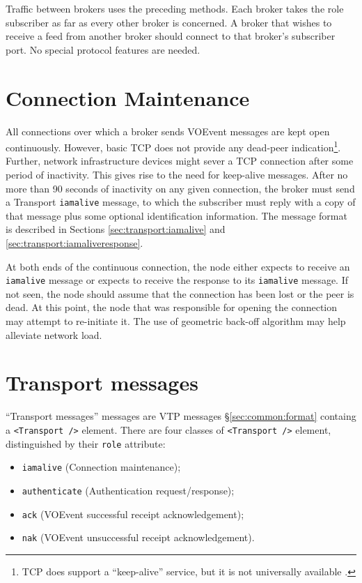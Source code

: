 \documentclass[a4paper,11pt]{ivoa}
\begin{document}
Traffic between brokers uses the preceding methods. Each broker takes the role
subscriber as far as every other broker is concerned. A broker that wishes to
receive a feed from another broker should connect to that broker's subscriber
port. No special protocol features are needed.

\section{Connection Maintenance}
\label{sec:maintenance}

All connections over which a broker sends VOEvent messages are kept open
continuously. However, basic TCP does not provide any dead-peer
indication\footnote{ TCP does support a ``keep-alive'' service, but it is not
universally available \citep{Braden:1989}.}. Further, network infrastructure
devices might sever a TCP connection after some period of inactivity. This
gives rise to the need for keep-alive messages. After no more than 90 seconds
of inactivity on any given connection, the broker must send a Transport
\texttt{iamalive} message, to which the subscriber must reply with a copy of
that message plus some optional identification information. The message format
is described in Sections \ref{sec:transport:iamalive} and
\ref{sec:transport:iamaliveresponse}.

At both ends of the continuous connection, the node either expects to receive
an \texttt{iamalive} message or expects to receive the response to its
\texttt{iamalive} message. If not seen, the node should assume that the
connection has been lost or the peer is dead. At this point, the node that was
responsible for opening the connection may attempt to re-initiate it. The use
of geometric back-off algorithm may help alleviate network load.

\section{Transport messages}
\label{sec:transport}

``Transport messages'' messages are VTP messages \S\ref{sec:common:format}
containg a \texttt{<Transport~/>} element. There are four classes of
\texttt{<Transport~/>} element, distinguished by their \texttt{role}
attribute:

\begin{itemize}
\item{\texttt{iamalive} (Connection maintenance);}
\item{\texttt{authenticate} (Authentication request/response);}
\item{\texttt{ack} (VOEvent successful receipt acknowledgement);}
\item{\texttt{nak} (VOEvent unsuccessful receipt acknowledgement).}
\end{itemize}
\end{document}
